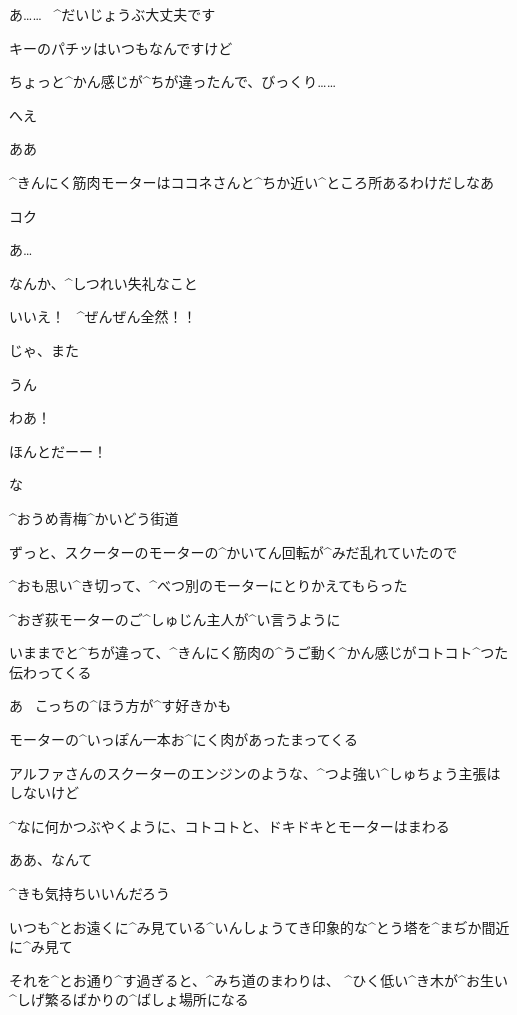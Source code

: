 \Kokone あ……
\ ^{だいじょうぶ}{大丈夫}です

\Kokone キーのパチッはいつもなんですけど

\Kokone ちょっと^{かん}{感}じが^{ちが}{違}ったんで、びっくり……

\Person へえ

\page
\Person ああ

\Person ^{きんにく}{筋肉}モーターはココネさんと^{ちか}{近}い^{ところ}{所}あるわけだしなあ

\Kokone コク

\Person あ…

\Person なんか、^{しつれい}{失礼}なこと

\Kokone いいえ！
\ ^{ぜんぜん}{全然}！！

\Kokone じゃ、また

\Person うん

\page
\Kokone わあ！

\Kokone ほんとだーー！

\Person な

\page
\Sign ^{おうめ}{青梅}^{かいどう}{街道}

\Kokone ずっと、スクーターのモーターの^{かいてん}{回転}が^{みだ}{乱}れていたので

\Kokone ^{おも}{思}い^{き}{切}って、^{べつ}{別}のモーターにとりかえてもらった

\Kokone ^{おぎ}{荻}モーターのご^{しゅじん}{主人}が^{い}{言}うように

\Kokone いままでと^{ちが}{違}って、^{きんにく}{筋肉}の^{うご}{動}く^{かん}{感}じがコトコト^{つた}{伝}わってくる

\Kokone あ
\ こっちの^{ほう}{方}が^{す}{好}きかも

\page
\Kokone モーターの^{いっぽん}{一本}お^{にく}{肉}があったまってくる

\Kokone アルファさんのスクーターのエンジンのような、^{つよ}{強}い^{しゅちょう}{主張}はしないけど

\Kokone ^{なに}{何}かつぶやくように、コトコトと、ドキドキとモーターはまわる

\page
\Kokone ああ、なんて

\Kokone ^{きも}{気持}ちいいんだろう

\page
\Kokone いつも^{とお}{遠}くに^{み}{見}ている^{いんしょうてき}{印象的}な^{とう}{塔}を^{まぢか}{間近}に^{み}{見}て

\page
\Kokone それを^{とお}{通}り^{す}{過}ぎると、^{みち}{道}のまわりは、
^{ひく}{低}い^{き}{木}が^{お}{生}い^{しげ}{繁}るばかりの^{ばしょ}{場所}になる


